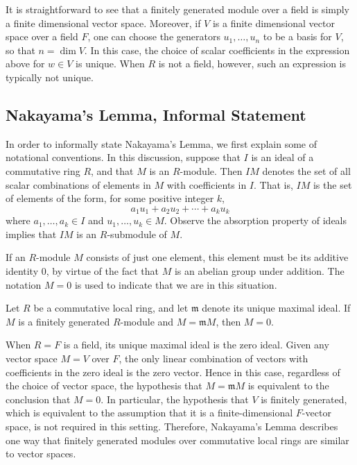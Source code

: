 \documentclass{article}
\begin{document}
It is straightforward to see that a finitely generated module over a field is  
simply a finite dimensional vector space.
Moreover, if $V$ is a finite dimensional vector space over a field 
$F$, one can choose the generators $u_1, \ldots, u_n$ to be a basis for $V$, so that  
$n = \dim V$. In this case, the choice of scalar coefficients in the expression
above for $w \in V$ is unique. When $R$ is not a field, however, such an
expression is typically not unique. 


\subsection{Nakayama's Lemma, Informal Statement}

In order to informally state Nakayama's Lemma, we first explain some of notational 
conventions.  In this discussion, suppose that  $I$ is an ideal of a commutative ring $R$, 
and that $M$ is an $R$-module. Then $IM$ denotes the set of all scalar combinations of 
elements in $M$ with coefficients in $I$.  That is, $IM$ is the set of  elements of the form, 
for some positive integer $k$,
 \[a_1 u_1 + a_2 u_2 + \cdots + a_k u_k\] 
where $a_1, \ldots, a_k \in I$ and
$u_1, \ldots, u_k \in M$. Observe the absorption property of ideals implies that 
$I M$ is an $R$-submodule of $M$. 

If an $R$-module $M$ consists of just one element, this element must be its
additive identity $0$, by virtue of the fact that $M$ is an abelian group under addition. 
The notation $M=0$ is used to indicate that we are in this situation. 

\begin{nak*}
Let $R$ be a commutative local ring, and let $\mathfrak{m}$ denote its unique
maximal ideal. If $M$ is a finitely generated $R$-module and
$M = \mathfrak{m} M$, then $M = 0$. 
\end{nak*}

When $R=F$ is a field, its unique maximal ideal is the zero ideal.  
Given any vector space $M=V$ over $F$, the only linear combination of vectors with
coefficients in the zero ideal is the zero vector. Hence in this case, regardless of the choice of 
vector space, the hypothesis that  $M = \mathfrak{m} M$ is equivalent to the conclusion that
$M=0$. 
In particular, the hypothesis that $V$ is finitely generated, which is equivalent to the
assumption that it is a finite-dimensional $F$-vector space, is not required in this setting. 
Therefore, Nakayama's Lemma describes one way that finitely generated modules
over commutative local rings are similar to vector spaces. 
\end{document}
